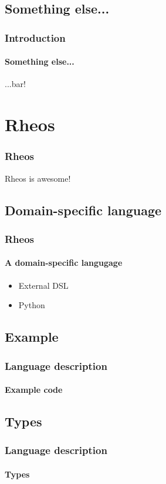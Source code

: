 \documentclass[10pt]{beamer}
\begin{document}
\subsection*{Something else...}
\begin{frame}
  \frametitle{Introduction}
  \framesubtitle{Something else...}
  ...bar!
\end{frame}


\section{Rheos}
\begin{frame}
  \frametitle{Rheos}
  Rheos is awesome!
\end{frame}


\subsection*{Domain-specific language}
\begin{frame}
\frametitle{Rheos}
\framesubtitle{A domain-specific langugage}

\begin{itemize}
\pause
\item External DSL
\pause
\item Python
\end{itemize}

\end{frame}


\subsection*{Example}
\begin{frame}
\frametitle{Language description}
\framesubtitle{Example code}
\end{frame}


\subsection*{Types}
\begin{frame}
\frametitle{Language description}
\framesubtitle{Types}

\end{frame}
\end{document}
